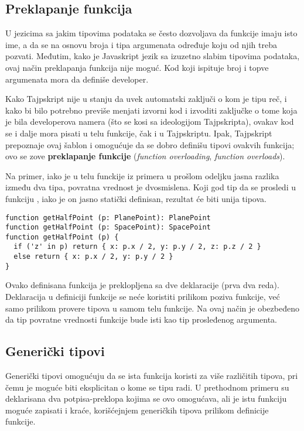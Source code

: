 \subsection{Preklapanje funkcija}

U jezicima sa jakim tipovima podataka se često dozvoljava da funkcije imaju isto ime, a da se na osnovu broja i tipa argumenata određuje koju od njih treba pozvati.
Međutim, kako je Javaskript jezik sa izuzetno slabim tipovima podataka, ovaj način preklapanja funkcija nije moguć.
Kod koji ispituje broj i topve argumenata mora da definiše developer.

Kako Tajpskript nije u stanju da uvek automatski zaključi o kom je tipu reč, i kako bi bilo potrebno previše menjati izvorni kod i izvoditi zaključke o tome koja je bila developerova namera (što se kosi sa ideologijom Tajpskripta), ovakav kod se i dalje mora pisati u telu funkcije, čak i u Tajpskriptu.
Ipak, Tajpskript prepoznaje ovaj šablon i omogućuje da se dobro definišu tipovi ovakvih funkcija; ovo se zove \textbf{preklapanje funkcije} (\textsl{function overloading}, \textsl{function overloads}).

Na primer, iako je u telu funckije iz primera u prošlom odeljku jasna razlika između dva tipa, povratna vrednost je dvosmislena.
Koji god tip da se prosledi u funkciju , iako je on jasno statički definisan, rezultat će biti unija tipova.

\begin{verbatim}
function getHalfPoint (p: PlanePoint): PlanePoint
function getHalfPoint (p: SpacePoint): SpacePoint
function getHalfPoint (p) {
  if ('z' in p) return { x: p.x / 2, y: p.y / 2, z: p.z / 2 }
  else return { x: p.x / 2, y: p.y / 2 }
}
\end{verbatim}

Ovako definisana funkcija je preklopljena sa dve deklaracije (prva dva reda).
Deklaracija u definiciji funkcije se neće koristiti prilikom poziva funkcije, već samo prilikom provere tipova u samom telu funkcije.
Na ovaj način je obezbeđeno da tip povratne vrednosti funkcije bude isti kao tip prosleđenog argumenta.

\subsection{Generički tipovi}

Generički tipovi omogućuju da se ista funkcija koristi za više različitih tipova, pri čemu je moguće biti eksplicitan o kome se tipu radi.
U prethodnom primeru su deklarisana dva potpisa-preklopa kojima se ovo omogućava, ali je istu funkciju moguće zapisati i kraće, korišćejnjem generičkih tipova prilikom definicije funkcije.

